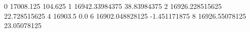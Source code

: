 0 17008.125 104.625
1 16942.33984375 38.83984375
2 16926.228515625 22.728515625
4 16903.5 0.0
6 16902.048828125 -1.451171875
8 16926.55078125 23.05078125
